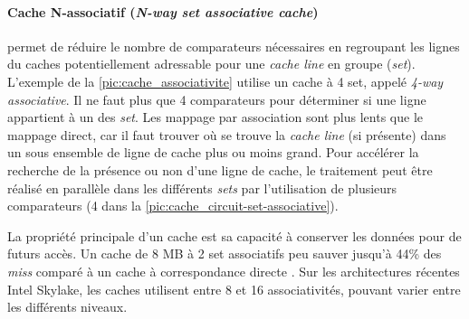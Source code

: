 \paragraph{Cache N-associatif (\textit{N-way set associative cache})} permet de réduire le nombre de comparateurs nécessaires en regroupant les lignes du caches potentiellement adressable pour une \textit{cache line} en groupe (\textit{set}). L'exemple de la \autoref{pic:cache_associativite} utilise un cache à 4 set, appelé \textit{4-way associative}. Il ne faut plus que 4 comparateurs pour déterminer si une ligne appartient à un des \textit{set}. Les mappage par association sont plus lents que le mappage direct, car il faut trouver où se trouve la \textit{cache line} (si présente) dans un sous ensemble de ligne de cache plus ou moins grand. Pour accélérer la recherche de la présence ou non d'une ligne de cache, le traitement peut être réalisé en parallèle dans les différents \textit{sets} par l'utilisation de plusieurs comparateurs (4 dans la \autoref{pic:cache_circuit-set-associative}). 

La propriété principale d'un cache est sa capacité à conserver les données pour de futurs accès. Un cache de 8 MB à 2 set associatifs peu sauver jusqu'à 44\% des \textit{miss} comparé à un cache à correspondance directe \cite{Drepper2007}. Sur les architectures récentes Intel Skylake, les caches utilisent entre 8 et 16 associativités, pouvant varier entre les différents niveaux. 


